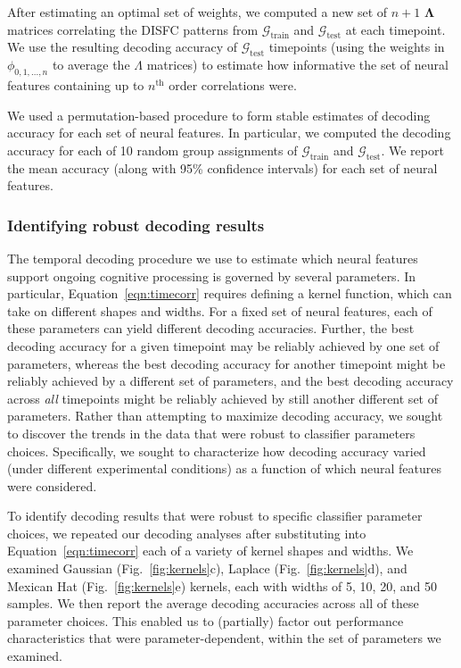 \documentclass[english]{article}
\begin{document}
After estimating an optimal set of weights, we computed a new set of
$n + 1$ $\mathbf{\Lambda}$ matrices correlating the DISFC patterns
from $\mathcal{G}_{\mathrm{train}}$ and $\mathcal{G}_{\mathrm{test}}$
at each timepoint.  We use the resulting decoding accuracy of
$\mathcal{G}_{\mathrm{test}}$ timepoints (using the weights in
$\phi_{0, 1, ..., n}$ to average the $\Lambda$ matrices) to estimate how informative
the set of neural features containing up to $n^\mathrm{th}$ order
correlations were.

We used a permutation-based procedure to form stable estimates of
decoding accuracy for each set of neural features.  In particular, we
computed the decoding accuracy for each of 10 random group assignments of
$\mathcal{G}_{\mathrm{train}}$ and $\mathcal{G}_{\mathrm{test}}$.  We
report the mean accuracy (along with 95\% confidence intervals) for each set
of neural features.


\subsubsection*{Identifying robust decoding results}
The temporal decoding procedure we use to estimate which neural
features support ongoing cognitive processing is governed by several
parameters. In particular, Equation~\ref{eqn:timecorr} requires
defining a kernel function, which can take on different shapes and
widths.  For a fixed set of neural features, each of these parameters
can yield different decoding accuracies.  Further, the best decoding
accuracy for a given timepoint may be reliably achieved by one set of
parameters, whereas the best decoding accuracy for another timepoint
might be reliably achieved by a different set of parameters, and the
best decoding accuracy across \textit{all} timepoints might be
reliably achieved by still another different set of parameters.
Rather than attempting to maximize decoding accuracy, we sought to
discover the trends in the data that were robust to classifier
parameters choices.  Specifically, we sought to characterize how
decoding accuracy varied (under different experimental conditions) as
a function of which neural features were considered.

To identify decoding results that were robust to specific classifier
parameter choices, we repeated our decoding analyses after
substituting into Equation~\ref{eqn:timecorr} each of a variety of
kernel shapes and widths.  We examined Gaussian
(Fig.~\ref{fig:kernels}c), Laplace (Fig.~\ref{fig:kernels}d), and
Mexican Hat (Fig.~\ref{fig:kernels}e) kernels, each with widths of 5,
10, 20, and 50 samples.  We then report the average decoding
accuracies across all of these parameter choices.  This enabled us to
(partially) factor out performance characteristics that were
parameter-dependent, within the set of parameters we examined.
\end{document}
